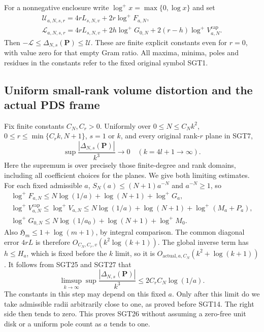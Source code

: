 \documentclass[10pt]{article}
\begin{document}
For a nonnegative enclosure write $\log^+x=\max\{0,\log x\}$ and set
\[
\begin{gathered}
 \mathcal U_{a,N,s,r}
    =4rL_{s,N,v}+2r\log^+F_{a,N},\\
 \mathcal L_{a,N,s,r}
    =4rL_{s,N,v}+2h\log^+G_{0,N}
                    +2(r-h)\log^+V_{a,N}^{\mathrm{cap}} .
\end{gathered}\tag{SGT25}
\]
Then $-\mathcal L\le\Delta_{N,s}(\mathbf P)\le\mathcal U$.
These are finite explicit constants even for $r=0$, with value zero
for that empty Gram ratio. All maxima, minima, poles and residues
in the constants refer to the fixed original symbol SGT1.

\subsection{Uniform small-rank volume distortion and the actual PDS frame}

Fix finite constants $C_N,C_r>0$. Uniformly over
$0\le N\le C_Nk^2$, $0\le r\le\min\{C_rk,N+1\}$,
$s=1$ or $k$, and every original rank-$r$ plane in SGT7,
\[
 \boxed{\qquad
 \sup\frac{|\Delta_{N,s}(\mathbf P)|}{k^3}
                   \longrightarrow0
 \quad(k=4l+1\longrightarrow\infty).
 \qquad}\tag{SGT26}
\]
Here the supremum is over precisely those finite-degree and rank
domains, including all coefficient choices for the planes.
We give both limiting estimates. For each fixed admissible $a$,
$S_N(a)\le(N+1)a^{-N}$ and $a^{-N}\ge1$, so
\[
\begin{gathered}
 \log^+F_{a,N}\le N\log(1/a)+\log(N+1)+\log^+G_a,\\
 \log^+V_{a,N}^{\mathrm{cap}}
 \le\log^+V_{a,N}
 \le N\log(1/a)+\log(N+1)+\log^+(M_a+P_a),\\
 \log^+G_{0,N}
 \le N\log(1/a_0)+\log(N+1)+\log^+M_0 .
\end{gathered}\tag{SGT27}
\]
Also $\mathfrak H_m\le1+\log(m+1)$, by integral comparison.
The common diagonal error $4rL$ is therefore
$O_{C_N,C_r,v}(k^2\log(k+1))$. The global inverse term has
$h\le H_a$, which is fixed before the $k$ limit, so it is
$O_{\mathrm{actual},a,C_N}(k^2+\log(k+1))$.
It follows from SGT25 and SGT27 that
\[
 \limsup_{k\to\infty}
 \sup\frac{|\Delta_{N,s}(\mathbf P)|}{k^3}
       \le 2C_rC_N\log(1/a).
 \tag{SGT28}
\]
The constants in this step may depend on this fixed $a$.
Only after this limit do we take admissible radii arbitrarily close
to one, as proved before SGT14. The right side then tends to zero.
This proves SGT26 without assuming a zero-free unit disk or a
uniform pole count as $a$ tends to one.
\end{document}
